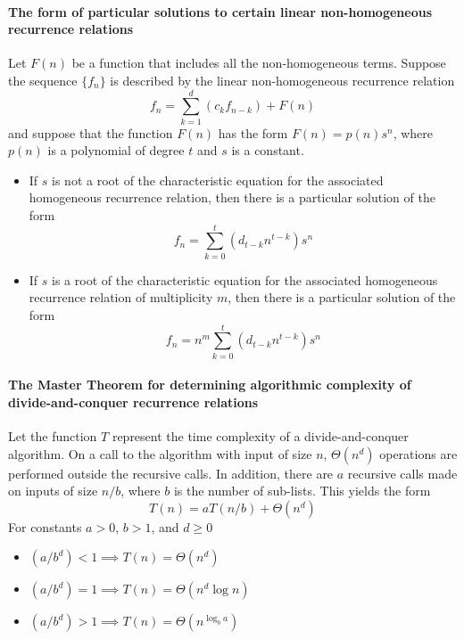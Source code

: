 \documentclass[a4paper]{article}
\begin{document}
\paragraph{The form of particular solutions to certain linear non-homogeneous recurrence relations}
Let $F(n)$ be a function that includes all the non-homogeneous terms. Suppose the sequence $\{f_n\}$ is described by the linear non-homogeneous recurrence relation
\begin{equation*}
  f_n = \sum_{k=1}^{d} (c_k f_{n-k}) + F(n)
\end{equation*}
and suppose that the function $F(n)$ has the form $F(n) = p(n)s^n$, where $p(n)$ is a polynomial of degree $t$ and $s$ is a constant.
\begin{itemize}
  \item If $s$ is not a root of the characteristic equation for the associated homogeneous recurrence relation, then there is a particular solution of the form
    \begin{equation*}
      f_n = \sum_{k=0}^{t} (d_{t-k} n^{t-k}) s^n
    \end{equation*}
  \item If $s$ is a root of the characteristic equation for the associated homogeneous recurrence relation of multiplicity $m$, then there is a particular solution of the form 
    \begin{equation*}
      f_n = n^m \sum_{k=0}^{t} (d_{t-k} n^{t-k}) s^n
    \end{equation*}
\end{itemize}
\paragraph{The Master Theorem for determining algorithmic complexity of divide-and-conquer recurrence relations}
Let the function $T$ represent the time complexity of a divide-and-conquer algorithm. On a call to the algorithm with input of size $n$, $\Theta(n^d)$ operations are performed outside the recursive calls. In addition, there are $a$ recursive calls made on inputs of size $n/b$, where $b$ is the number of sub-lists. This yields the form
\begin{equation*}
  T(n) = aT(n/b)+\Theta(n^d)
\end{equation*}
For constants $a > 0$, $b > 1$, and $d \geq 0$
\begin{itemize}
  \item $(a/b^d) < 1 \implies T(n) = \Theta(n^d)$
  \item $(a/b^d) = 1 \implies T(n) = \Theta(n^d \log n)$
  \item $(a/b^d) > 1 \implies T(n) = \Theta(n^{\log_b a})$
\end{itemize}
\end{document}
